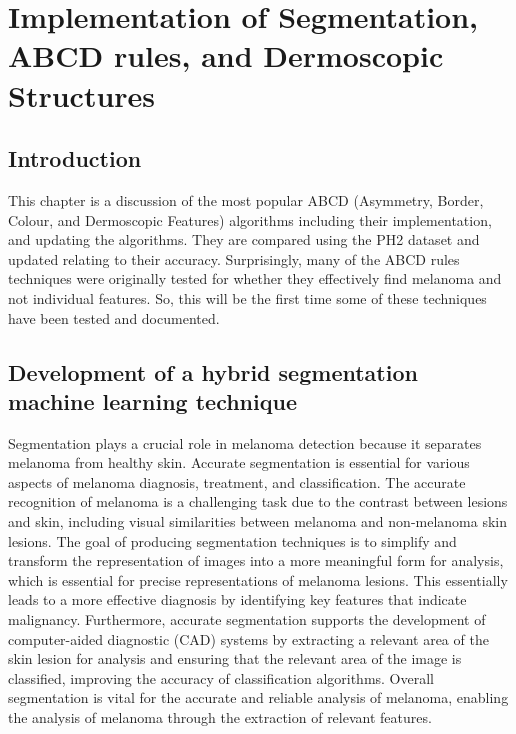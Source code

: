 
\chapter{Implementation of Segmentation, ABCD rules, and Dermoscopic Structures}

\section{Introduction}
This chapter is a discussion of the most popular ABCD (Asymmetry, Border, Colour, and Dermoscopic Features) algorithms including their implementation, and updating the algorithms. They are compared using the PH2 dataset and updated relating to their accuracy. Surprisingly, many of the ABCD rules techniques were originally tested for whether they effectively find melanoma and not individual features. So, this will be the first time some of these techniques have been tested and documented.

\section{Development of a hybrid segmentation machine learning technique}
Segmentation plays a crucial role in melanoma detection because it separates melanoma from healthy skin. Accurate segmentation is essential for various aspects of melanoma diagnosis, treatment, and classification\cite{Albahli2020}. The accurate recognition of melanoma is a challenging task due to the contrast between lesions and skin, including visual similarities between melanoma and non-melanoma skin lesions\cite{li2018}. The goal of producing segmentation techniques is to simplify and transform the representation of images into a more meaningful form for analysis, which is essential for precise representations of melanoma lesions\cite{Masood2013}. This essentially leads to a more effective diagnosis by identifying key features that indicate malignancy\cite{ali2023}. Furthermore, accurate segmentation supports the development of computer-aided diagnostic (CAD) systems by extracting a relevant area of the skin lesion for analysis and ensuring that the relevant area of the image is classified, improving the accuracy of classification algorithms\cite{bi2019}. Overall segmentation is vital for the accurate and reliable analysis of melanoma, enabling the analysis of melanoma through the extraction of relevant features.

